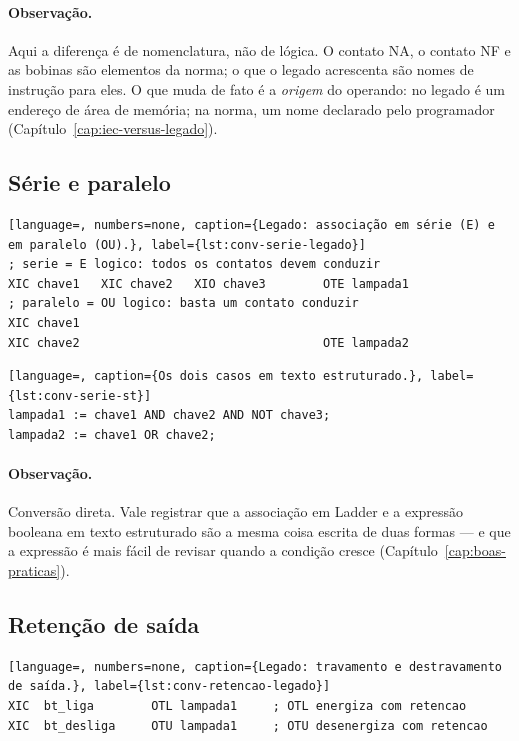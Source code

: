 \paragraph{Observação.} Aqui a diferença é de nomenclatura, não de lógica. O contato NA, o contato NF
e as bobinas são elementos da norma; o que o legado acrescenta são nomes de instrução para eles. O que
muda de fato é a \emph{origem} do operando: no legado é um endereço de área de memória; na norma, um
nome declarado pelo programador (Capítulo~\ref{cap:iec-versus-legado}).

\subsection{Série e paralelo}

\begin{lstlisting}[language=, numbers=none, caption={Legado: associação em série (E) e em paralelo (OU).}, label={lst:conv-serie-legado}]
; serie = E logico: todos os contatos devem conduzir
XIC chave1   XIC chave2   XIO chave3        OTE lampada1
; paralelo = OU logico: basta um contato conduzir
XIC chave1
XIC chave2                                  OTE lampada2
\end{lstlisting}

\begin{lstlisting}[language=, caption={Os dois casos em texto estruturado.}, label={lst:conv-serie-st}]
lampada1 := chave1 AND chave2 AND NOT chave3;
lampada2 := chave1 OR chave2;
\end{lstlisting}

\paragraph{Observação.} Conversão direta. Vale registrar que a associação em Ladder e a expressão
booleana em texto estruturado são a mesma coisa escrita de duas formas --- e que a expressão é mais
fácil de revisar quando a condição cresce (Capítulo~\ref{cap:boas-praticas}).

\subsection{Retenção de saída}

\begin{lstlisting}[language=, numbers=none, caption={Legado: travamento e destravamento de saída.}, label={lst:conv-retencao-legado}]
XIC  bt_liga        OTL lampada1     ; OTL energiza com retencao
XIC  bt_desliga     OTU lampada1     ; OTU desenergiza com retencao
\end{lstlisting}

